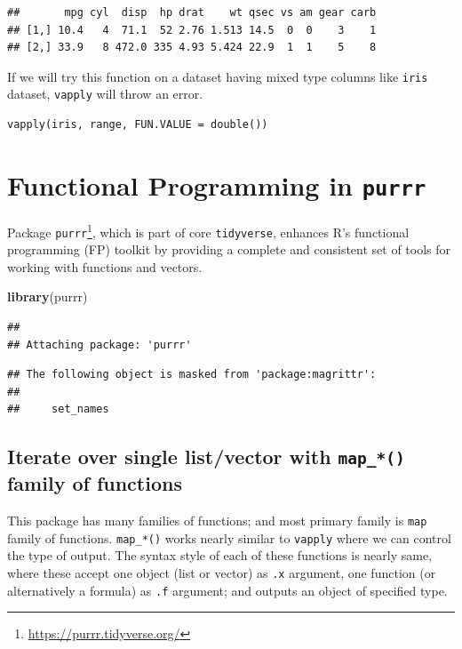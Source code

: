 \documentclass[
]{book}
\newenvironment{Shaded}{\begin{snugshade}}{\end{snugshade}}
\newcommand{\FunctionTok}[1]{\textcolor[rgb]{0.13,0.29,0.53}{\textbf{#1}}}
\newcommand{\NormalTok}[1]{#1}
\begin{document}
\begin{verbatim}
##       mpg cyl  disp  hp drat    wt qsec vs am gear carb
## [1,] 10.4   4  71.1  52 2.76 1.513 14.5  0  0    3    1
## [2,] 33.9   8 472.0 335 4.93 5.424 22.9  1  1    5    8
\end{verbatim}

If we will try this function on a dataset having mixed type columns like \texttt{iris} dataset, \texttt{vapply} will throw an error.

\begin{verbatim}
vapply(iris, range, FUN.VALUE = double())
\end{verbatim}

\hypertarget{purrr}{%
\section{\texorpdfstring{Functional Programming in \texttt{purrr}}{Functional Programming in purrr}}\label{purrr}}

Package \texttt{purrr}\footnote{\url{https://purrr.tidyverse.org/}}, which is part of core \texttt{tidyverse}, enhances R's functional programming (FP) toolkit by providing a complete and consistent set of tools for working with functions and vectors.

\begin{Shaded}
\begin{Highlighting}[]
\FunctionTok{library}\NormalTok{(purrr)}
\end{Highlighting}
\end{Shaded}

\begin{verbatim}
## 
## Attaching package: 'purrr'
\end{verbatim}

\begin{verbatim}
## The following object is masked from 'package:magrittr':
## 
##     set_names
\end{verbatim}

\hypertarget{iterate-over-single-listvector-with-map_-family-of-functions}{%
\subsection{\texorpdfstring{Iterate over single list/vector with \texttt{map\_*()} family of functions}{Iterate over single list/vector with map\_*() family of functions}}\label{iterate-over-single-listvector-with-map_-family-of-functions}}

This package has many families of functions; and most primary family is \texttt{map} family of functions. \texttt{map\_*()} works nearly similar to \texttt{vapply} where we can control the type of output. The syntax style of each of these functions is nearly same, where these accept one object (list or vector) as \texttt{.x} argument, one function (or alternatively a formula) as \texttt{.f} argument; and outputs an object of specified type.
\end{document}

